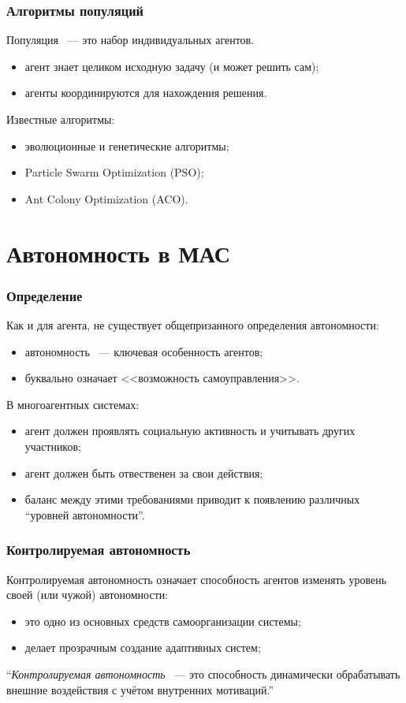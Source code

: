 \documentclass{beamer}
\begin{document}
\begin{frame}
  \frametitle{Алгоритмы популяций}
  Популяция ~--- это набор индивидуальных агентов.
  \begin{itemize}
    \item агент знает целиком исходную задачу (и может решить сам);
    \item агенты координируются для нахождения решения.
  \end{itemize}

  Известные алгоритмы:
  \begin{itemize}
    \item эволюционные и генетические алгоритмы;
    \item Particle Swarm Optimization (PSO);
    \item Ant Colony Optimization (ACO).
  \end{itemize}
\end{frame}

\section{Автономность в МАС}

\begin{frame}
  \frametitle{Определение}
  Как и для агента, не существует общепризанного определения автономности:
  \begin{itemize}
    \item автономность ~--- ключевая особенность агентов;
    \item буквально означает <<возможность самоуправления>>.
  \end{itemize}

  В многоагентных системах:
  \begin{itemize}
    \item агент должен проявлять социальную активность и учитывать других участников;
    \item агент должен быть отвественен за свои действия;
    \item баланс между этими требованиями приводит к появлению различных ``уровней автономности''.
  \end{itemize}
\end{frame}

\begin{frame}
  \frametitle{Контролируемая автономность}
  Контролируемая автономность означает способность агентов изменять
  уровень своей (или чужой) автономности:
  \begin{itemize}
    \item это одно из основных средств самоорганизации системы;
    \item делает прозрачным создание адаптивных систем;
  \end{itemize}

  \begin{exampleblock}{}
    {\large ``{\it Контролируемая автономность} ~--- это способность динамически
    обрабатывать внешние воздействия с учётом внутренних мотиваций.''}
    \vskip5mm
    \hspace*{}
  \end{exampleblock}
\end{frame}
\end{document}
